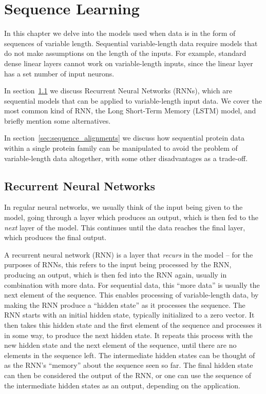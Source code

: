 \chapter{Sequence Learning}
\label{chapter:sequence_learning}
In this chapter we delve into the models used when data is in the form of sequences of variable length. Sequential variable-length data require models that do not make assumptions on the length of the inputs. For example, standard dense linear layers cannot work on variable-length inputs, since the linear layer has a set number of input neurons.

In section~\ref{sec:recurrent_neural_networks} we discuss Recurrent Neural Networks (RNNs), which are sequential models that can be applied to variable-length input data. We cover the most common kind of RNN, the Long Short-Term Memory (LSTM) model, and briefly mention some alternatives.

In section~\ref{sec:sequence_alignments} we discuss how sequential protein data  within a single protein family can be manipulated to avoid the problem of variable-length data altogether, with some other disadvantages as a trade-off.



\section{Recurrent Neural Networks}
\label{sec:recurrent_neural_networks}
In regular neural networks, we usually think of the input being given to the model, going through a layer which produces an output, which is then fed to the \textit{next} layer of the model. This continues until the data reaches the final layer, which produces the final output.

A recurrent neural network (RNN) is a layer that \textit{recurs} in the model -- for the purposes of RNNs, this refers to the input being processed by the RNN, producing an output, which is then fed into the RNN again, usually in combination with more data. For sequential data, this ``more data'' is usually the next element of the sequence. This enables processing of variable-length data, by making the RNN produce a ``hidden state'' as it processes the sequence. The RNN starts with an initial hidden state, typically initialized to a zero vector. It then takes this hidden state and the first element of the sequence and processes it in some way, to produce the next hidden state. It repeats this process with the new hidden state and the next element of the sequence, until there are no elements in the sequence left. The intermediate hidden states can be thought of as the RNN's ``memory'' about the sequence seen so far. The final hidden state can then be considered the output of the RNN, or one can use the sequence of the intermediate hidden states as an output, depending on the application.


